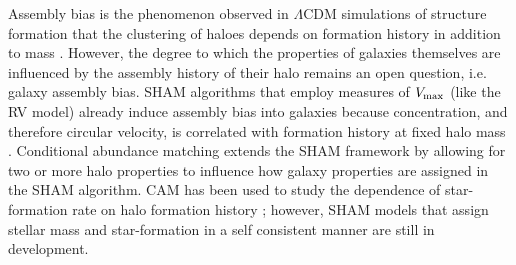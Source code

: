 \documentclass[useAMS,fleqn,usenatbib]{mnras}
\begin{document}
Assembly bias is the phenomenon observed in $\Lambda$CDM simulations of structure formation that the clustering of haloes depends on formation history in addition to mass \citep{Gao:2005ds, Wechsler:2006rg, Zentner:2007bk, Gao:2007yy, li:2008oi, Sunayama:2015ue, Mao:2017ww}.  However, the degree to which the properties of galaxies themselves are influenced by the assembly history of their halo remains an open question, i.e. galaxy assembly bias.  SHAM algorithms that employ measures of $V_{\rm max}$ (like the RV model) already induce assembly bias into galaxies because concentration, and therefore circular velocity, is correlated with formation history at fixed halo mass \citep{Zentner:2014ki,Lehmann:2017fy}.  Conditional abundance matching \citep[CAM,][]{Hearin:2014hh} extends the SHAM framework by allowing for two or more halo properties to influence how galaxy properties are assigned in the SHAM algorithm.  CAM has been used to study the dependence of star-formation rate on halo formation history \citep{Hearin:2013km, Hearin:2014hh, Watson:2015gq, Saito:2015vi, Paranjape:2015uy}; however, SHAM models that assign stellar mass and star-formation in a self consistent manner are still in development.
\end{document}
